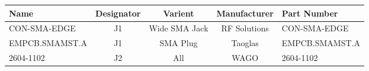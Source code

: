 \documentclass{standalone}
\begin{document}
\centering
\begin{tabular}{lcccl}
	\toprule
	\textbf{Name}  & \textbf{Designator} & \textbf{Varient} & \textbf{Manufacturer} & \textbf{Part Number} \\
	\midrule
	CON-SMA-EDGE   & J1                  & Wide SMA Jack    & RF Solutions          & CON-SMA-EDGE         \\
	EMPCB.SMAMST.A & J1                  & SMA Plug         & Taoglas               & EMPCB.SMAMST.A       \\
	2604-1102      & J2                  & All              & WAGO                  & 2604-1102            \\
	\bottomrule
\end{tabular}
\end{document}
